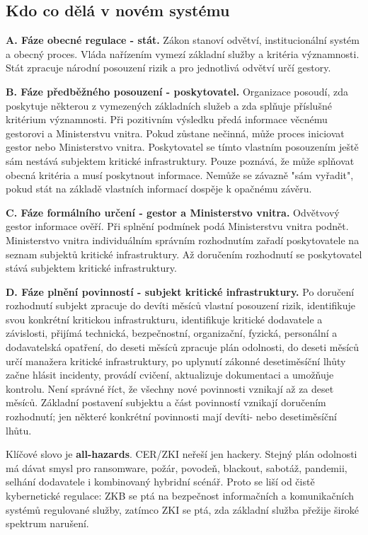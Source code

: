 \subsection*{Kdo co dělá v novém systému}
\textbf{A. Fáze obecné regulace - stát.} Zákon stanoví odvětví, institucionální systém a obecný proces. Vláda nařízením vymezí základní služby a kritéria významnosti. Stát zpracuje národní posouzení rizik a pro jednotlivá odvětví určí gestory.

\textbf{B. Fáze předběžného posouzení - poskytovatel.} Organizace posoudí, zda poskytuje některou z vymezených základních služeb a zda splňuje příslušné kritérium významnosti. Při pozitivním výsledku předá informace věcnému gestorovi a Ministerstvu vnitra. Pokud zůstane nečinná, může proces iniciovat gestor nebo Ministerstvo vnitra. Poskytovatel se tímto vlastním posouzením ještě sám nestává subjektem kritické infrastruktury. Pouze poznává, že může splňovat obecná kritéria a musí poskytnout informace. Nemůže se závazně "sám vyřadit", pokud stát na základě vlastních informací dospěje k opačnému závěru.

\textbf{C. Fáze formálního určení - gestor a Ministerstvo vnitra.} Odvětvový gestor informace ověří. Při splnění podmínek podá Ministerstvu vnitra podnět. Ministerstvo vnitra individuálním správním rozhodnutím zařadí poskytovatele na seznam subjektů kritické infrastruktury. Až doručením rozhodnutí se poskytovatel stává subjektem kritické infrastruktury.

\textbf{D. Fáze plnění povinností - subjekt kritické infrastruktury.} Po doručení rozhodnutí subjekt zpracuje do devíti měsíců vlastní posouzení rizik, identifikuje svou konkrétní kritickou infrastrukturu, identifikuje kritické dodavatele a závislosti, přijímá technická, bezpečnostní, organizační, fyzická, personální a dodavatelská opatření, do deseti měsíců zpracuje plán odolnosti, do deseti měsíců určí manažera kritické infrastruktury, po uplynutí zákonné desetiměsíční lhůty začne hlásit incidenty, provádí cvičení, aktualizuje dokumentaci a umožňuje kontrolu. Není správné říct, že všechny nové povinnosti vznikají až za deset měsíců. Základní postavení subjektu a část povinností vznikají doručením rozhodnutí; jen některé konkrétní povinnosti mají devíti- nebo desetiměsíční lhůtu.

Klíčové slovo je \textbf{all-hazards}. CER/ZKI neřeší jen hackery. Stejný plán odolnosti má dávat smysl pro ransomware, požár, povodeň, blackout, sabotáž, pandemii, selhání dodavatele i kombinovaný hybridní scénář. Proto se liší od čistě kybernetické regulace: ZKB se ptá na bezpečnost informačních a komunikačních systémů regulované služby, zatímco ZKI se ptá, zda základní služba přežije široké spektrum narušení.

